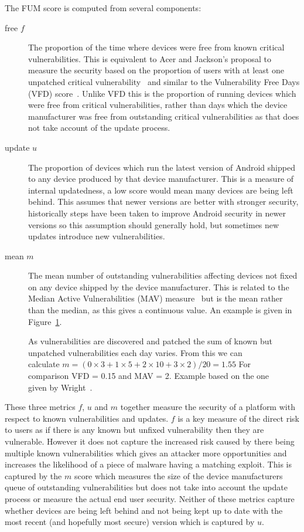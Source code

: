 The FUM score is computed from several components:
\begin{description}
  \item[free $f$] The proportion of the time where devices were free from known critical vulnerabilities. This is equivalent to Acer and Jackson's proposal to measure the security based on the proportion of users with at least one unpatched critical vulnerability~\cite{Acer2010} and similar to the Vulnerability Free Days (VFD) score~\cite{Wright2014}.
  Unlike VFD this is the proportion of running devices which were free from critical vulnerabilities, rather than days which the device manufacturer was free from outstanding critical vulnerabilities as that does not take account of the update process.
  \item[update $u$] The proportion of devices which run the latest version of Android shipped to any device produced by that device manufacturer. This is a measure of internal updatedness, a low score would mean many devices are being left behind.
  This assumes that newer versions are better with stronger security, historically steps have been taken to improve Android security in newer versions so this assumption should generally hold, but sometimes new updates introduce new vulnerabilities.
  \item[mean $m$] The mean number of outstanding vulnerabilities affecting devices not fixed on any device shipped by the device manufacturer. This is related to the Median Active Vulnerabilities (MAV) measure~\cite{Wright2014} but is the mean rather than the median, as this gives a continuous value.
  An example is given in Figure~\ref{fig:mcalculation}.
\end{description}

\begin{figure}
\centering

\caption{As vulnerabilities are discovered and patched the sum of known but unpatched vulnerabilities each day varies. From this we can calculate $m = (0 \times 3 + 1 \times 5 + 2 \times 10 + 3 \times 2) / 20 = 1.55$ For comparison VFD = 0.15 and MAV = 2. Example based on the one given by Wright~\cite{Wright2014}.}
\label{fig:mcalculation}
\end{figure}

These three metrics $f$, $u$ and $m$ together measure the security of a platform with respect to known vulnerabilities and updates.
$f$ is a key measure of the direct risk to users as if there is any known but unfixed vulnerability then they are vulnerable.
However it does not capture the increased risk caused by there being multiple known vulnerabilities which gives an attacker more opportunities and increases the likelihood of a piece of malware having a matching exploit.
This is captured by the $m$ score which measures the size of the device manufacturers queue of outstanding vulnerabilities but does not take into account the update process or measure the actual end user security.
Neither of these metrics capture whether devices are being left behind and not being kept up to date with the most recent (and hopefully most secure) version which is captured by $u$.

